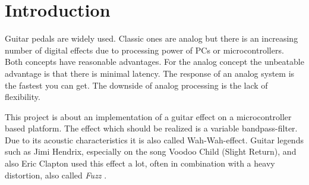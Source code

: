 \section{Introduction}

Guitar pedals are widely used. Classic ones are analog but there is an increasing number of
digital effects due to processing power of PCs or microcontrollers. Both concepts have
reasonable advantages. For the analog concept the unbeatable advantage is that there is
minimal latency. The response of an analog system is the fastest you can get. The downside of analog
processing is the lack of flexibility.

This project is about an implementation of a guitar effect on a microcontroller based platform.
The effect which should be realized is a variable bandpass-filter.
Due to its acoustic characteristics it is also called \frqq Wah-Wah\flqq-effect.
Guitar legends such as Jimi Hendrix, especially on the song Voodoo Child (Slight Return),
and also Eric Clapton used this effect a lot, often in combination with a heavy distortion, also called \textit{Fuzz}
\cite{dailey_e_guitar} \cite{wiki_wahwah}.
